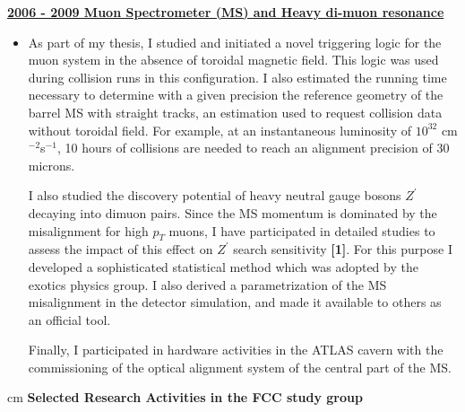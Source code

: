 \documentclass[12pt]{article}
\begin{document}
{\bf \underline{2006 - 2009 Muon Spectrometer (MS) and Heavy di-muon resonance}}
\vskip 0.2cm
\begin{itemize}[leftmargin=1.3cm]
\itemsep0.8em
 \item[] 
As part of my thesis, I studied and initiated a novel triggering logic for the muon system in the absence of toroidal magnetic field. This logic was used during collision runs in this configuration. I also estimated the running time necessary to determine with a given precision the reference geometry of the barrel MS with straight tracks, an estimation used to request collision data without toroidal field. For example, at an instantaneous luminosity of $10^{32}$ cm$^{-2}$s$^{-1}$, 10 hours of collisions are needed to reach an alignment precision of 30 microns. 


\vspace{2.mm}
I also studied the discovery potential of heavy neutral gauge bosons $Z^{\prime}$ decaying into dimuon pairs. 
Since the MS momentum is dominated by the misalignment for high $p_T$ muons, I have participated in detailed studies to assess the impact of this effect on $Z^{\prime}$ search sensitivity {\bf \color{red}[1]}. For this purpose I developed a sophisticated statistical method which was adopted by the exotics physics group. I also derived a parametrization of the MS misalignment in the detector simulation, and made it available to others as an official tool.

\vspace{2.mm}
Finally, I participated in hardware activities in the ATLAS cavern with the commissioning of the optical alignment system of the central part of the MS.
\end{itemize}


 cm
{\bf \Large Selected Research Activities in the FCC study group}
\vskip 0.4cm
\end{document}
